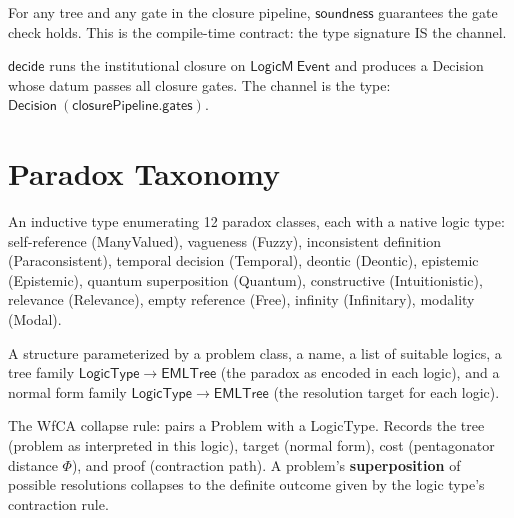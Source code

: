 \begin{theorem}
\label{thm:pipeline_soundness}
\leanok
{}
For any tree and any gate in the closure pipeline,
$\mathsf{soundness}$ guarantees the gate check holds.
This is the compile-time contract: the type signature IS the channel.
\end{theorem}

\begin{theorem}
\label{thm:decide_soundness}
\leanok
{}
$\mathsf{decide}$ runs the institutional closure on $\mathsf{LogicM\ Event}$
and produces a Decision whose datum passes all closure gates.
The channel is the type: $\mathsf{Decision\ (closurePipeline.gates)}$.
\end{theorem}

\section{Paradox Taxonomy}

\begin{definition}
\label{def:problemclass}
\leanok
An inductive type enumerating 12 paradox classes, each with a native logic type:
self-reference (ManyValued), vagueness (Fuzzy), inconsistent definition (Paraconsistent),
temporal decision (Temporal), deontic (Deontic), epistemic (Epistemic),
quantum superposition (Quantum), constructive (Intuitionistic), relevance (Relevance),
empty reference (Free), infinity (Infinitary), modality (Modal).
\end{definition}

\begin{definition}[Problem]
\label{def:problem}
\leanok
{}
A structure parameterized by a problem class, a name, a list of suitable logics,
a tree family $\mathsf{LogicType} \to \mathsf{EMLTree}$ (the paradox as encoded in each logic),
and a normal form family $\mathsf{LogicType} \to \mathsf{EMLTree}$ (the resolution target for each logic).
\end{definition}

\begin{definition}
\label{def:wrapped}
\leanok
{}
The WfCA collapse rule: pairs a Problem with a LogicType.
Records the tree (problem as interpreted in this logic), target (normal form),
cost (pentagonator distance $\Phi$), and proof (contraction path).
A problem's \textbf{superposition} of possible resolutions collapses to the
definite outcome given by the logic type's contraction rule.
\end{definition}

